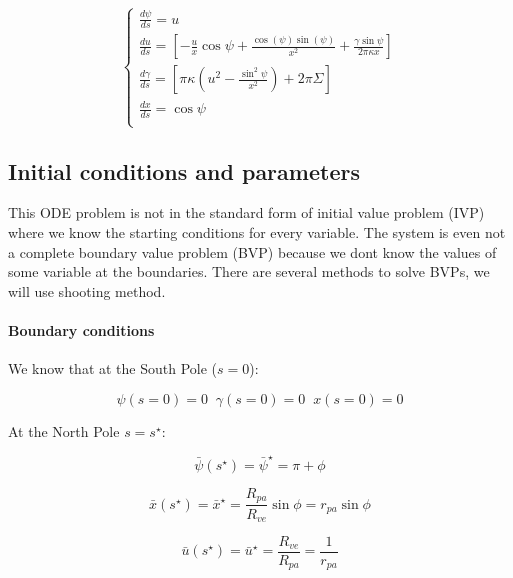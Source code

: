\documentclass[12pt]{article}
\begin{document}
\begin{equation}
  \begin{cases} 
    \frac{d\psi}{ds} =  u \\[3mm]
    \frac{du}{ds} =  [-\frac{u}{x}\cos\psi+\frac{\cos(\psi)\sin(\psi)}{x^2}+\frac{\gamma\sin \psi}{2\pi \kappa x}] \\[3mm]
    \frac{d\gamma}{ds} =  [\pi \kappa (u^2-\frac{\sin^2 \psi}{x^2})+2 \pi \Sigma] \\[3mm]
    \frac{dx}{ds} =  \cos \psi \\[3mm]
  \end{cases}
\end{equation}






\subsection{Initial conditions and parameters}
This ODE problem is not in the standard form of initial value problem (IVP) where we know the starting conditions for every variable. The system is even not a complete boundary value problem (BVP) because we dont know the values of some variable at the boundaries. There are several methods to solve BVPs, we will use shooting method.

\paragraph{Boundary conditions} 
We know that at the South Pole ($s=0$):

$$
\psi(s=0)=0 \; \; \gamma(s=0)=0 \; \; x(s=0) = 0
$$

At the North Pole $s=s^\star$:

$$
\bar{\psi}(s^\star) = \bar{\psi}^\star = \pi + \phi
$$


$$
\bar{x}(s^\star) = \bar{x}^\star =\frac{R_{pa}}{R_{ve}} \sin \phi = r_{pa} \sin \phi
$$

$$
\bar{u}(s^\star) = \bar{u}^\star = \frac{R_{ve}}{R_{pa}} = \frac{1}{r_{pa}}
$$
\end{document}
